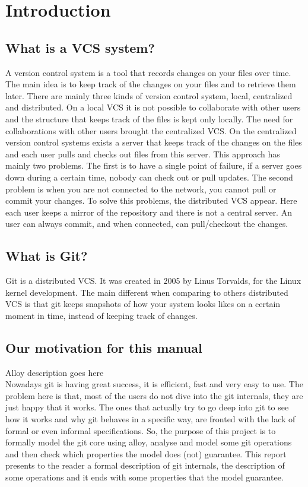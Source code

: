 \section{Introduction}
\subsection{What is a VCS system?}
A \Gls{version control system} is a tool that records changes on your
files over time. The main idea is to keep track of the changes on your
files and to retrieve them later. There are mainly three kinds of 
\Gls{version control system}, local, centralized and distributed. On
a local VCS it is not possible to collaborate with other users and
the structure that keeps track of the files is kept only locally. The
need for collaborations with other users brought the centralized VCS.
On the centralized version control systems exists a server that keeps
track of the changes on the files and each user pulls and checks out files
from this server. This approach has mainly two problems. The
first is to have a single point of failure, if a server goes down
during a certain time, nobody can check out or pull updates. The
second problem is when you are not connected to the network, you
cannot pull or commit your changes. To solve this problems, the
distributed VCS appear. Here each user keeps a mirror of the
repository and there is not a central server. An user can always commit,
and when connected, can pull/checkout the changes.\\
\subsection{What is Git?}
Git is a distributed VCS. It was created in 2005 by Linus Torvalds,
for the Linux kernel development. The main different when comparing to
others distributed VCS is that git keeps snapshots of how your system
looks likes on a certain moment in time, instead of keeping track of
changes.\\
\subsection{Our motivation for this manual}
Alloy description goes here\\
Nowadays git is having great success, it is efficient, fast and very
easy to use. The problem here is that, most of the users do not dive
into the git internals, they are just happy that it works. The ones
that actually try to go deep into git to see how it works and why git
behaves in a specific way, are fronted with the lack of formal or even
informal specifications.  So, the purpose of this project is to
formally model the git core using alloy, analyse and model some git
operations and then check which properties the model does (not)
guarantee. This report presents to the reader a formal description of
git internals, the description of some operations and it ends with
some properties that the model guarantee.\\

